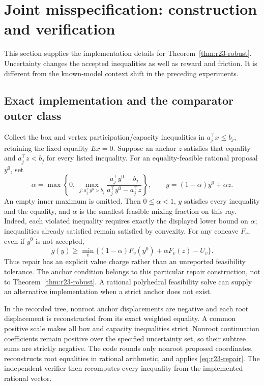 \section{Joint misspecification: construction and verification}\label{ec:r23-robust}
This section supplies the implementation details for Theorem~\ref{thm:r23-robust}. Uncertainty changes the accepted inequalities as well as reward and friction. It is different from the known-model context shift in the preceding experiments.

\subsection{Exact implementation and the comparator outer class}
Collect the box and vertex participation/capacity inequalities in $a_j^\top x\leq b_j$, retaining the fixed equality $Ex=0$. Suppose an anchor $z$ satisfies that equality and $a_j^\top z<b_j$ for every listed inequality. For an equality-feasible rational proposal $y^0$, set
\begin{equation}\label{eq:r23-repair}
 \alpha=\max\left\{0,\ \max_{j:a_j^\top y^0>b_j}
 \frac{a_j^\top y^0-b_j}{a_j^\top y^0-a_j^\top z}\right\},\qquad
 y=(1-\alpha)y^0+\alpha z.
\end{equation}
An empty inner maximum is omitted. Then $0\leq\alpha<1$, $y$ satisfies every inequality and the equality, and $\alpha$ is the smallest feasible mixing fraction on this ray. Indeed, each violated inequality requires exactly the displayed lower bound on $\alpha$; inequalities already satisfied remain satisfied by convexity. For any concave $F_v$, even if $y^0$ is not accepted,
\[
 g(y)\geq\min_v\{(1-\alpha)F_v(y^0)+\alpha F_v(z)-U_v\}.
\]
Thus repair has an explicit value charge rather than an unreported feasibility tolerance. The anchor condition belongs to this particular repair construction, not to Theorem~\ref{thm:r23-robust}. A rational polyhedral feasibility solve can supply an alternative implementation when a strict anchor does not exist.

In the recorded tree, nonroot anchor displacements are negative and each root displacement is reconstructed from its exact weighted equality. A common positive scale makes all box and capacity inequalities strict. Nonroot continuation coefficients remain positive over the specified uncertainty set, so their subtree sums are strictly negative. The code rounds only nonroot proposed coordinates, reconstructs root equalities in rational arithmetic, and applies \eqref{eq:r23-repair}. The independent verifier then recomputes every inequality from the implemented rational vector.


